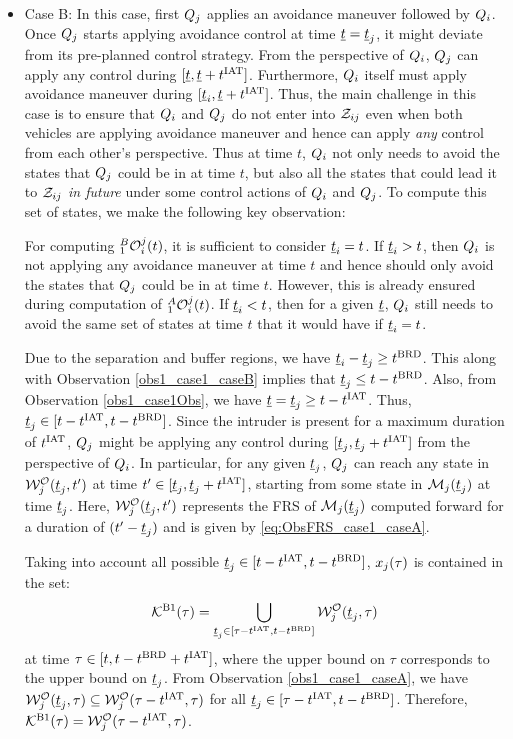 \begin{itemize}[leftmargin=*]
\item \label{sec:intruderObs_case1_caseB} Case B: In this case, first $Q_j$ applies an avoidance maneuver followed by $Q_i$. Once $Q_j$ starts applying avoidance control at time $\underline{t} = \underline{t}_j$, it might deviate from its pre-planned control strategy. From the perspective of $Q_i$, $Q_j$ can apply any control during $[\underline{t}, \underline{t}+t^\text{IAT}]$. Furthermore, $Q_i$ itself must apply avoidance maneuver during $[\underline{t}_i, \underline{t}+t^\text{IAT}]$. Thus, the main challenge in this case is to ensure that $Q_i$ and $Q_j$ do not enter into $\mathcal{Z}_{ij}$ even when both vehicles are applying avoidance maneuver and hence can apply \textit{any} control from each other's perspective. Thus at time $t$, $Q_i$ not only needs to avoid the states that $Q_j$ could be in at time $t$, but also all the states that could lead it to $\mathcal{Z}_{ij}$ \textit{in future} under some control actions of $Q_i$ and $Q_j$. To compute this set of states, we make the following key observation:
\begin{observation} \label{obs1_case1_caseB}
For computing $_1^B\mathcal{O}_i^j(t)$, it is sufficient to consider $\underline{t}_i = t$. If $\underline{t}_i > t$, then $Q_i$ is not applying any avoidance maneuver at time $t$ and hence should only avoid the states that $Q_j$ could be in at time $t$. However, this is already ensured during computation of $_1^A\mathcal{O}_i^j(t)$. If $\underline{t}_i < t$, then for a given $\underline{t}$, $Q_i$ still needs to avoid the same set of states at time $t$ that it would have if $\underline{t}_i = t$.  
\end{observation}

Due to the separation and buffer regions, we have $\underline{t}_i - \underline{t}_j \geq t^\text{BRD}$. This along with Observation \ref{obs1_case1_caseB} implies that $\underline{t}_j \leq t - t^\text{BRD}$. Also, from Observation \ref{obs1_case1Obs}, we have $\underline{t} = \underline{t}_j \geq t-t^\text{IAT}$. Thus, $\underline{t}_j \in [t-t^\text{IAT}, t-t^\text{BRD}]$. Since the intruder is present for a maximum duration of $t^\text{IAT}$, $Q_j$ might be applying any control during $[\underline{t}_j, \underline{t}_j + t^\text{IAT}]$ from the perspective of $Q_i$. In particular, for any given $\underline{t}_j$, $Q_j$ can reach any state in $\mathcal{W}_{j}^{\mathcal{O}}(\underline{t}_j, t')$ at time $t' \in [\underline{t}_j, \underline{t}_j+t^\text{IAT}]$, starting from some state in $\mathcal{M}_j(\underline{t}_j)$ at time $\underline{t}_j$. Here, $\mathcal{W}_{j}^{\mathcal{O}}(\underline{t}_j, t')$ represents the FRS of $\mathcal{M}_j(\underline{t}_j)$ computed forward for a duration of $(t' - \underline{t}_j)$ and is given by \eqref{eq:ObsFRS_case1_caseA}. 

Taking into account all possible $\underline{t}_j \in [t-t^\text{IAT}, t-t^\text{BRD}]$, $x_j(\tau)$ is contained in the set:
\begin{equation}
\mathcal{K}^{\text{B1}}(\tau) = \bigcup_{\underline{t}_j \in [\tau-t^\text{IAT}, t-t^\text{BRD}]} \mathcal{W}_{j}^{\mathcal{O}}(\underline{t}_j, \tau)
\end{equation} 
at time $\tau \in [t, t-t^\text{BRD}+t^\text{IAT}]$, where the upper bound on $\tau$ corresponds to the upper bound on $\underline{t}_j$. From Observation \ref{obs1_case1_caseA}, we have $\mathcal{W}_{j}^{\mathcal{O}}(\underline{t}_j, \tau) \subseteq \mathcal{W}_{j}^{\mathcal{O}}(\tau-t^\text{IAT}, \tau)$ for all $\underline{t}_j \in [\tau-t^\text{IAT}, t-t^\text{BRD}]$. Therefore, $\mathcal{K}^{\text{B1}}(\tau) = \mathcal{W}_{j}^{\mathcal{O}}(\tau-t^\text{IAT}, \tau)$.


\end{itemize}

